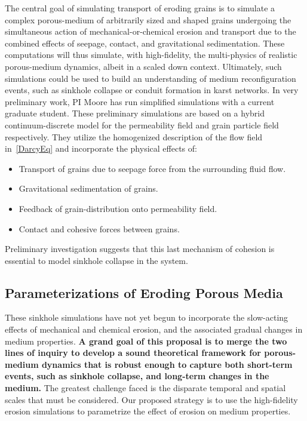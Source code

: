 \documentclass[11pt]{article}
\begin{document}
The central goal of simulating transport of eroding grains is to simulate a complex porous-medium of arbitrarily sized and shaped grains undergoing the simultaneous action of mechanical-or-chemical erosion and transport due to the combined effects of seepage, contact, and gravitational sedimentation. These computations will thus simulate, with high-fidelity, the multi-physics of realistic porous-medium dynamics, albeit in a scaled down context. Ultimately, such simulations could be used to build an understanding of medium reconfiguration events, such as sinkhole collapse or conduit formation in karst networks. In very preliminary work, PI Moore has run simplified simulations with a current graduate student. These preliminary simulations are based on a hybrid continuum-discrete model for the permeability field and grain particle field respectively. They utilize the homogenized description of the flow field in~\eqref{DarcyEq} and incorporate the physical effects of: 
\begin{itemize}[noitemsep]
\item Transport of grains due to seepage force from the surrounding fluid flow.
\item Gravitational sedimentation of grains.
\item Feedback of grain-distribution onto permeability field.
\item Contact and cohesive forces between grains.
\end{itemize}
Preliminary investigation suggests that this last mechanism of cohesion is essential to model sinkhole collapse in the system.

\subsection{Parameterizations of Eroding Porous Media}
These sinkhole simulations have not yet begun to incorporate the slow-acting effects of mechanical and chemical erosion, and the associated gradual changes in medium properties. {\bf A grand goal of this proposal is to merge the two lines of inquiry to develop a sound theoretical framework for porous-medium dynamics that is robust enough to capture both short-term events, such as sinkhole collapse, and long-term changes in the medium.} The greatest challenge faced is the disparate temporal and spatial scales that must be considered. Our proposed strategy is to use the high-fidelity erosion simulations to parametrize the effect of erosion on medium properties.
\end{document}
